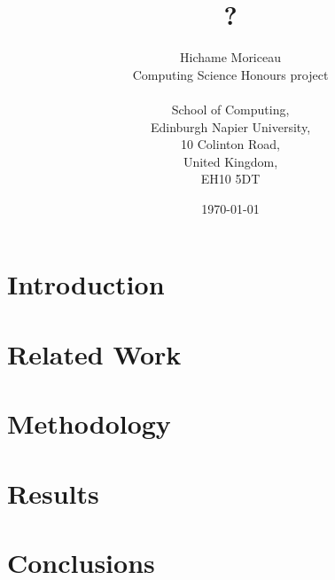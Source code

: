 \documentclass[a4paper,12pt, oneside]{report}
\begin{document}
\title{?}
\author{Hichame Moriceau\\
  Computing Science Honours project\\ \\
  School of Computing,\\
  Edinburgh Napier University,\\
  10 Colinton Road,\\
  United Kingdom,\\
  EH10 5DT\\}
\date{\today}
\maketitle

\begin{abstract}

\end{abstract}

\section{Introduction}

\section{Related Work}

\section{Methodology}

\section{Results}

\section{Conclusions}


\clearpage
{}

\end{document}
